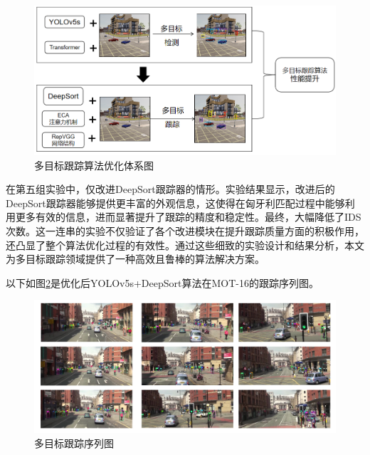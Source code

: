 \begin{figure}[htbp] %
	\centering
	\includegraphics[width=1\textwidth]{np17} %
	\caption{多目标跟踪算法优化体系图} %
	\label{fig:np17} %
\end{figure}





在第五组实验中，仅改进DeepSort跟踪器的情形。实验结果显示，改进后的DeepSort跟踪器能够提供更丰富的外观信息，这使得在匈牙利匹配过程中能够利用更多有效的信息，进而显著提升了跟踪的精度和稳定性。最终，大幅降低了IDS次数。这一连串的实验不仅验证了各个改进模块在提升跟踪质量方面的积极作用，还凸显了整个算法优化过程的有效性。通过这些细致的实验设计和结果分析，本文为多目标跟踪领域提供了一种高效且鲁棒的算法解决方案。

以下如图\ref{fig:np100}是优化后YOLOv5s+DeepSort算法在MOT-16的跟踪序列图。

\begin{figure}[htbp] %
	\centering
	\includegraphics[width=1\textwidth]{np100} %
	\caption{多目标跟踪序列图} %
	\label{fig:np100} %
\end{figure}


